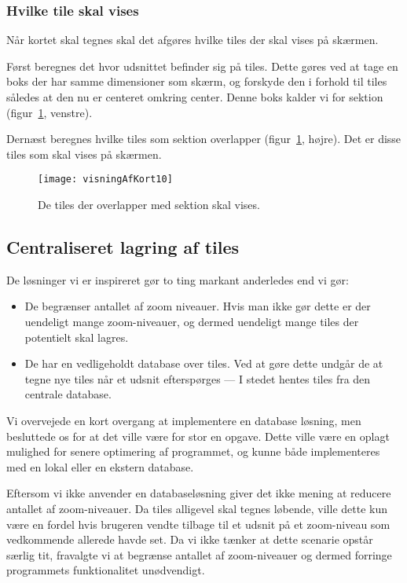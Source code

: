 \subsubsection{Hvilke tile skal vises}
\label{subsec:hvilkeTilesSkalVises}

Når kortet skal tegnes skal det afgøres hvilke tiles der skal vises på skærmen.

Først beregnes det hvor udsnittet befinder sig på tiles. Dette gøres ved at tage en boks der har samme dimensioner som skærm, og forskyde den i forhold til tiles således at den nu er centeret omkring center. Denne boks kalder vi for sektion (figur~\ref{figur:visningAfKort10}, venstre).

Dernæst beregnes hvilke tiles som sektion overlapper (figur~\ref{figur:visningAfKort10}, højre). Det er disse tiles som skal vises på skærmen.

\begin{figure}[h]
	\centering
	\texttt{[image: visningAfKort10]}
	\captionsetup{width=0.8\textwidth}
	\caption{De tiles der overlapper med sektion skal vises.}
	\label{figur:visningAfKort10}
\end{figure}

\subsection{Centraliseret lagring af tiles}
\label{subsec:centraliseretLagringAfTiles}

De løsninger vi er inspireret gør to ting markant anderledes end vi gør:

\begin{itemize}
	\item De begrænser antallet af zoom niveauer. Hvis man ikke gør dette er der uendeligt mange zoom-niveauer, og dermed uendeligt mange tiles der potentielt skal lagres.
	\item De har en vedligeholdt database over tiles. Ved at gøre dette undgår de at tegne nye tiles når et udsnit efterspørges --- I stedet hentes tiles fra den centrale database.
\end{itemize}

Vi overvejede en kort overgang at implementere en database løsning, men besluttede os for at det ville være for stor en opgave. Dette ville være en oplagt mulighed for senere optimering af programmet, og kunne både implementeres med en lokal eller en ekstern database.

Eftersom vi ikke anvender en databaseløsning giver det ikke mening at reducere antallet af zoom-niveauer. Da tiles alligevel skal tegnes løbende, ville dette kun være en fordel hvis brugeren vendte tilbage til et udsnit på et zoom-niveau som vedkommende allerede havde set. Da vi ikke tænker at dette scenarie opstår særlig tit, fravalgte vi at begrænse antallet af zoom-niveauer og dermed forringe programmets funktionalitet unødvendigt.

